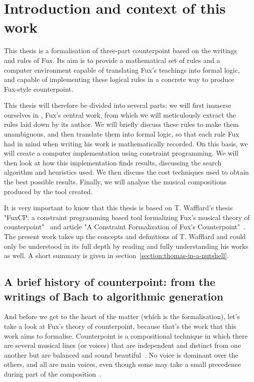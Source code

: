 \chapter{Introduction and context of this work}
This thesis is a formalisation of three-part counterpoint based on the writings and rules of Fux. Its aim is to provide a mathematical set of rules and a computer environment capable of translating Fux's teachings into formal logic, and capable of implementing these logical rules in a concrete way to produce Fux-style counterpoint.


This thesis will therefore be divided into several parts: we will first immerse ourselves in \gap, Fux's central work, from which we will meticulously extract the rules laid down by its author. We will briefly discuss these rules to make them unambiguous, and then translate them into formal logic, so that each rule Fux had in mind when writing his work is mathematically recorded. On this basis, we will create a computer implementation using constraint programming. We will then look at how this implementation finds results, discussing the search algorithm and heuristics used. We then discuss the cost techniques used to obtain the best possible results. Finally, we will analyse the musical compositions produced by the tool created.

It is very important to know that this thesis is based on T. Wafflard's thesis "FuxCP: a constraint programming based tool formalizing Fux's musical theory of counterpoint"~\cite{wafflard2023} and article "A Constraint Formalization of Fux's Counterpoint"~\cite{sprockeels2023constraint}. The present work takes up the concepts and definitions of T. Wafflard and could only be understood in its full depth by reading and fully understanding his works as well. A short summary is given in section~\ref{section:thomas-in-a-nutshell}.



\section{A brief history of counterpoint: from the writings of Bach to algorithmic generation}
And before we get to the heart of the matter (which is the formalisation), let's take a look at Fux's theory of counterpoint, because that's the work that this work aims to formalise. Counterpoint is a compositional technique in which there are several musical lines (or voices) that are independent and distinct from one another but are balanced and sound beautiful~\cite{CpSachs}. No voice is dominant over the others, and all are main voices, even though some may take a small precedence during part of the composition~\cite{hess2016}.  


